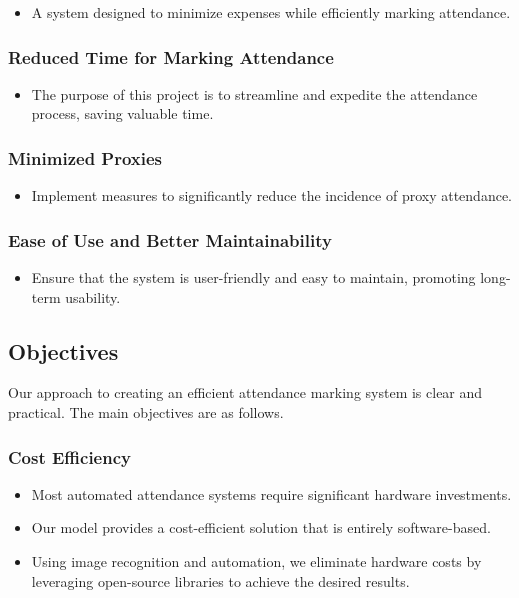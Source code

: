 \documentclass[a4paper,12pt]{article}
\begin{document}
\begin{itemize}
    \item A system designed to minimize expenses while efficiently marking attendance.
\end{itemize}

\subsubsection{Reduced Time for Marking Attendance}

\begin{itemize}
    \item The purpose of this project is to streamline and expedite the attendance process, saving valuable time.
\end{itemize}

\subsubsection{Minimized Proxies}

\begin{itemize}
    \item Implement measures to significantly reduce the incidence of proxy attendance.
\end{itemize}

\subsubsection{Ease of Use and Better Maintainability}

\begin{itemize}
    \item Ensure that the system is user-friendly and easy to maintain, promoting long-term usability.
\end{itemize}

\subsection{Objectives}

Our approach to creating an efficient attendance marking system is clear and practical. The main objectives are as follows.

\subsubsection{Cost Efficiency}

\begin{itemize}
    \item Most automated attendance systems require significant hardware investments.
    \item Our model provides a cost-efficient solution that is entirely software-based.
    \item Using image recognition and automation, we eliminate hardware costs by leveraging open-source libraries to achieve the desired results.
\end{itemize}
\end{document}
